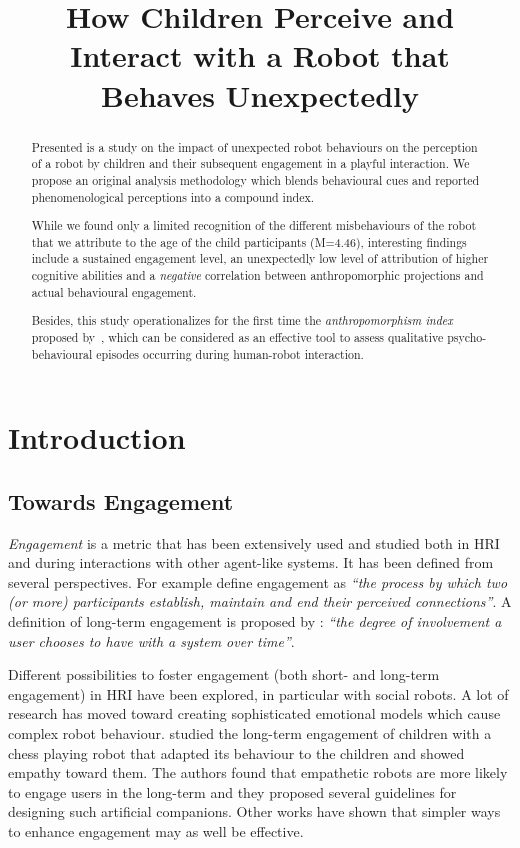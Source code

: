 \documentclass{sig-alternate}
\title{\LARGE \bf
How Children Perceive and Interact with a Robot that Behaves Unexpectedly
}
\begin{document}
\sloppy %
\maketitle
\begin{abstract}

Presented is a study on the impact of unexpected robot behaviours on the
perception of a robot by children and their subsequent engagement in a playful interaction.
We propose an original analysis methodology which blends behavioural cues and
reported phenomenological perceptions into a compound index.

While we found only a limited recognition of the different misbehaviours of the
robot that we attribute to the age of the child participants (M=4.46),
interesting findings include a sustained engagement level, an unexpectedly low
level of attribution of higher cognitive abilities and a \emph{negative}
correlation between anthropomorphic projections and actual behavioural
engagement.

Besides, this study operationalizes for the first time the
\emph{anthropomorphism index} proposed by~\cite{fink2014dynamics}, which can be
considered as an effective tool to assess qualitative psycho-behavioural
episodes occurring during human-robot interaction.

\end{abstract}
\section{Introduction}
\subsection{Towards Engagement}

\emph{Engagement} is a metric that has been extensively used and studied both
in HRI and during interactions with other agent-like systems. It has been
defined from several perspectives. For example \cite{sidner_where_2004} define
engagement as \textit{``the process by which two (or more) participants
establish, maintain and end their perceived connections''}. A definition of
long-term engagement is proposed by \cite{bickmore_maintaining_2010}:
\textit{``the degree of involvement a user chooses to have with a system over
time''}.

Different possibilities to foster engagement (both short- and long-term
engagement) in HRI have been explored, in particular with social robots. A lot
of research has moved toward creating sophisticated emotional models which cause
complex robot behaviour. \cite{leite_long-term_2013} studied the long-term
engagement of children with a chess playing robot that adapted its behaviour to
the children and showed empathy toward them. The authors found that empathetic robots
are more likely to engage users in the long-term and they proposed several
guidelines for designing such artificial companions. Other works
\cite{bickmore_maintaining_2010,short_no_2010} have shown that simpler ways to
enhance engagement may as well be effective.
\end{document}
